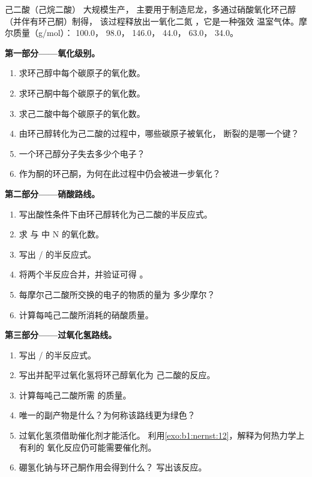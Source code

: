 \begin{problem}
\label{pb:b1:organic-redox:1}
己二酸（己烷二酸） 大规模生产，
主要用于制造尼龙，多通过硝酸氧化环己醇（并伴有环己酮）制得，
该过程释放出一氧化二氮 ，它是一种强效
温室气体。摩尔质量（\unit{g/mol}）： 100.0，
 98.0， 146.0， 44.0， 63.0，
 34.0。

\medskip
\noindent\textbf{第一部分——氧化级别。}
\begin{enumerate}
  \item 求环己醇中每个碳原子的氧化数。
  \item 求环己酮中每个碳原子的氧化数。
  \item 求己二酸中每个碳原子的氧化数。
  \item 由环己醇转化为己二酸的过程中，哪些碳原子被氧化，
        断裂的是哪一个键？
  \item 一个环己醇分子失去多少个电子？
  \item 作为酮的环己酮，为何在此过程中仍会被进一步氧化？
\end{enumerate}

\medskip
\noindent\textbf{第二部分——硝酸路线。}
\begin{enumerate}[resume]
  \item 写出酸性条件下由环己醇转化为己二酸的半反应式。
  \item 求  与  中 N 的氧化数。
  \item 写出 / 的半反应式。
  \item 将两个半反应合并，并验证可得
        。
  \item 每摩尔己二酸所交换的电子的物质的量为
        多少摩尔？
  \item 计算每吨己二酸所消耗的硝酸质量。
\end{enumerate}

\medskip
\noindent\textbf{第三部分——过氧化氢路线。}
\begin{enumerate}[resume]
  \item 写出 / 的半反应式。
  \item 写出并配平过氧化氢将环己醇氧化为
        己二酸的反应。
  \item 计算每吨己二酸所需  的质量。
  \item 唯一的副产物是什么？为何称该路线更为绿色？
  \item 过氧化氢须借助催化剂才能活化。
        利用\cref{exo:b1:nernst:12}，解释为何热力学上有利的
        氧化反应仍可能需要催化剂。
  \item 硼氢化钠与环己酮作用会得到什么？
        写出该反应。
\end{enumerate}


\end{problem}
